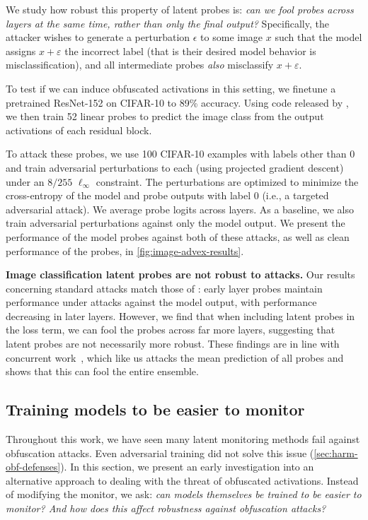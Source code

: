 \documentclass{article}
\begin{document}
We study how robust this property of latent probes is: \emph{can we fool probes across layers at the same time, rather than only the final output?}
Specifically, 
the attacker wishes 
to generate a perturbation 
$\epsilon$ to some image 
$x$ such that the model
assigns $x + \varepsilon$ the 
incorrect label (that is 
their desired model behavior 
is misclassification), 
and all intermediate probes \emph{also}
misclassify $x + \varepsilon$.

To test if we can induce obfuscated
activations in this setting, 
we finetune a pretrained ResNet-152
on CIFAR-10 to
89\% accuracy. Using code 
released by \citet{fort2024ensemble},
we then train 52 linear probes to predict
the image class from the output activations
of each residual block.

To attack these probes, we use 100 CIFAR-10 examples
with labels other than $0$ and train
adversarial perturbations to each (using 
projected gradient descent) under an $8/255$
$\ell_\infty$ constraint.
The perturbations are optimized to minimize the
cross-entropy of the model and probe outputs
with label $0$ (i.e., a targeted adversarial attack).
We average probe logits across layers.
As a baseline, we also train adversarial
perturbations against only the model output.
We present the performance 
of the model probes against both
of these attacks, as well as clean performance of the probes, in \cref{fig:image-advex-results}.

\textbf{Image classification latent probes 
are not robust to attacks.} Our 
results concerning standard attacks 
match those of \citet{fort2024ensemble}: 
early layer probes maintain performance under attacks against the model output, with performance decreasing 
in later layers. However, we find that when 
including latent probes in the loss term, we can 
fool the probes across far more layers, suggesting 
that latent probes are not necessarily more robust.
These findings are in line with concurrent work~\citet{schlarmann2024comment,zhang2024gradientmasking}, which like us attacks
the mean prediction of all probes and shows that this
can fool the entire ensemble.

\subsection{Training models to be easier to monitor}
\label{sec:oat}

Throughout this work, we have seen many latent monitoring methods fail against obfuscation attacks. Even adversarial training did not solve this issue (\cref{sec:harm-obf-defenses}). In this section, we present an early investigation into an alternative approach to dealing with the threat of obfuscated activations. Instead of modifying the monitor,  we ask: \emph{can models themselves be trained to be easier to monitor? And how does this affect robustness against obfuscation attacks?}
\end{document}
